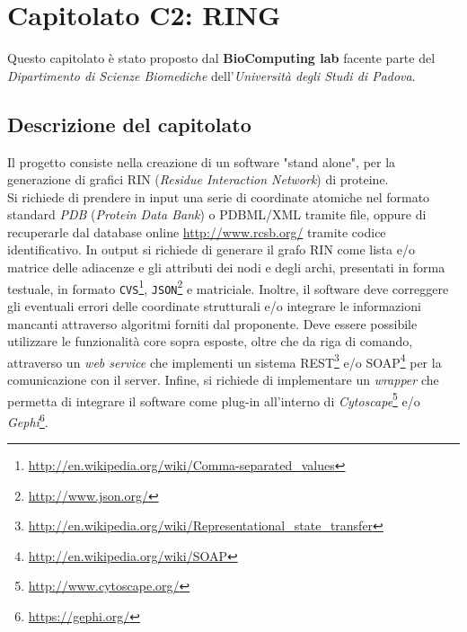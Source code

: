 \section{Capitolato C2: RING}
\label{capitolato2}
Questo capitolato è stato proposto dal \textbf{BioComputing lab} facente parte del \textit{Dipartimento di Scienze Biomediche} dell'\textit{Università degli Studi di Padova}.

\subsection{Descrizione del capitolato}
\label{descrizionecap2}
Il progetto consiste nella creazione di un software "stand alone", per la generazione di grafici RIN (\textit{Residue Interaction Network}) di proteine. \\ Si richiede di prendere in input una serie di coordinate atomiche nel formato standard \textit{PDB} (\textit{Protein Data Bank}) o PDBML/XML tramite file, oppure di recuperarle dal database online \url{http://www.rcsb.org/} tramite codice identificativo. In output si richiede di generare il grafo RIN come lista e/o matrice delle adiacenze e gli attributi dei nodi e degli archi, presentati in forma testuale, in formato \verb!CVS!\footnote{\url{http://en.wikipedia.org/wiki/Comma-separated_values}}, \verb!JSON!\footnote{\url{http://www.json.org/}} e matriciale. Inoltre, il software deve correggere gli eventuali errori delle coordinate strutturali e/o integrare le informazioni mancanti attraverso algoritmi forniti dal proponente. Deve essere possibile utilizzare le funzionalità core sopra esposte, oltre che da riga di comando, attraverso un \textit{web service} che implementi un sistema REST\footnote{\url{http://en.wikipedia.org/wiki/Representational_state_transfer}} e/o SOAP\footnote{\url{http://en.wikipedia.org/wiki/SOAP}} per la comunicazione con il server. Infine, si richiede di implementare un \textit{wrapper} che permetta di integrare il software come plug-in all'interno di \textit{Cytoscape}\footnote{\url{http://www.cytoscape.org/}} e/o \textit{Gephi}\footnote{\url{https://gephi.org/}}.

